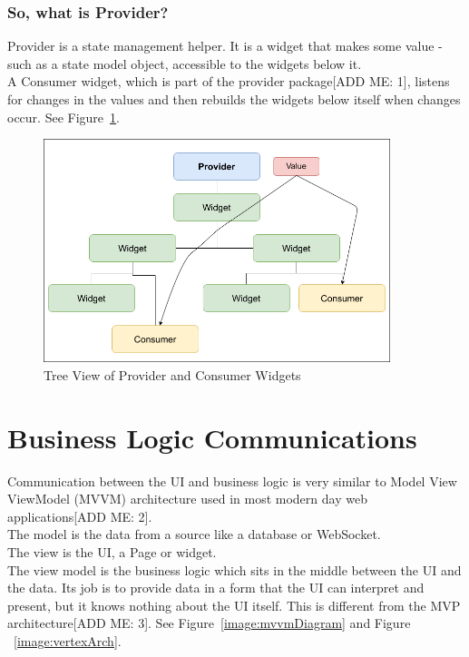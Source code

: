 \subsubsection{So, what is Provider?}
Provider is a state management helper. It is a widget that makes some value - such as a state model object, accessible to the widgets below it.
\\ A Consumer widget, which is part of the provider package[ADD ME: 1], listens for changes in the values and then rebuilds the widgets below itself when changes occur.
See Figure~\ref{image:providerTree}.

\begin{figure}[h!]
    \caption{Tree View of Provider and Consumer Widgets}
    \label{image:providerTree}
    \centering
    \includegraphics[width=0.9\textwidth]{images/consumer_tree_with_value.png}
\end{figure}

\section{Business Logic Communications}
Communication between the UI and business logic is very similar to Model View ViewModel (MVVM) architecture used in most modern day web applications[ADD ME: 2].
\\ The model is the data from a source like a database or WebSocket.
\\ The view is the UI, a Page or widget.
\\ The view model is the business logic which sits in the middle between the UI and the data. Its job is to provide data in a form that the UI can interpret and present, but it knows nothing about the UI itself. This is different from the MVP architecture[ADD ME: 3].
See Figure~\ref{image:mvvmDiagram} and Figure ~\ref{image:vertexArch}.

